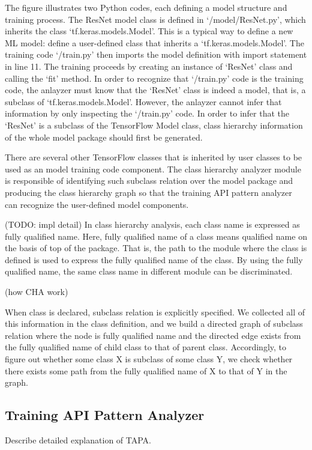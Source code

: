

The figure illustrates two Python codes, each defining a model structure
and training process. The ResNet model class is defined in `/model/ResNet.py',
which inherits the class `tf.keras.models.Model'.
This is a typical way to define a new ML model:
define a user-defined class that inherits a `tf.keras.models.Model'.
The training code `/train.py' then imports the model definition with
import statement in line 11.
The training proceeds by creating an instance of `ResNet' class
and calling the `fit' method.
In order to recognize that `/train.py' code is the training code,
the anlayzer must know that the `ResNet' class is indeed a model, that is,
a subclass of `tf.keras.models.Model'.
However, the anlayzer cannot infer that information
by only inspecting the `/train.py' code.
In order to infer that the `ResNet' is a subclass of the TensorFlow Model class,
class hierarchy information of the whole model package should first be generated.

There are several other TensorFlow classes that is inherited by user classes
to be used as an model training code component.
The class hierarchy analyzer module is responsible of identifying
such subclass relation over the model package and producing the
class hierarchy graph so that the training API pattern analyzer can
recognize the user-defined model components.

(TODO: impl detail)
In class hierarchy analysis, each class name is expressed as fully qualified name.
Here, fully qualified name of a class means qualified name\cite{???}
on the basis of top of the package.
That is, the path to the module where the class is defined
is used to express the fully qualified name of the class.
By using the fully qualified name, the same class name in different module
can be discriminated.

(how CHA work)

When class is declared, subclass relation is explicitly specified.
We collected all of this information in the class definition,
and we build a directed graph of subclass relation
where the node is fully qualified name and the directed edge exists
from the fully qualified name of child class to that of parent class.
Accordingly, to figure out whether some class X is subclass of some class Y,
we check whether there exists some path from the fully qualified name of X
to that of Y in the graph.

\subsection{Training API Pattern Analyzer}
Describe detailed explanation of TAPA.

